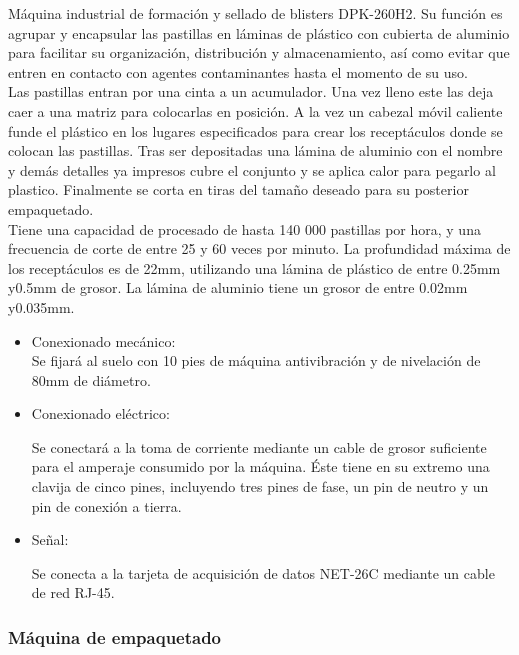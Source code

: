 	Máquina industrial de formación y sellado de blisters DPK-260H2. Su función es agrupar y encapsular las pastillas en láminas de plástico con cubierta de aluminio para facilitar su organización, distribución y almacenamiento, así como evitar que entren en contacto con agentes contaminantes hasta el momento de su uso.\\

	Las pastillas entran por una cinta a un acumulador. Una vez lleno este las deja caer a una matriz para colocarlas en posición. A la vez un cabezal móvil caliente funde el plástico en los lugares especificados para crear los receptáculos donde se colocan las pastillas. Tras ser depositadas una lámina de aluminio con el nombre y demás detalles ya impresos cubre el conjunto y se aplica calor para pegarlo al plastico. Finalmente se corta en tiras del tamaño deseado para su posterior empaquetado.\\


	Tiene una capacidad de procesado de hasta 140 000 pastillas por hora, y una frecuencia de corte de entre 25 y 60 veces por minuto. La profundidad máxima de los receptáculos es de 22mm, utilizando una lámina de plástico de entre 0.25mm y0.5mm de grosor. La lámina de aluminio tiene un grosor de entre 0.02mm y0.035mm.


		\begin{itemize}
				\item{Conexionado mecánico:}\\
				
				Se fijará al suelo con 10 pies de máquina antivibración y de nivelación de 80mm de diámetro.

				\item{Conexionado eléctrico:}

				Se conectará a la toma de corriente mediante un cable de grosor suficiente para el amperaje consumido por la máquina. Éste tiene en su extremo una clavija de cinco pines, incluyendo tres pines de fase, un pin de neutro y un pin de conexión a tierra.  
				
				\item{Señal:}

				Se conecta a la tarjeta de acquisición de datos NET-26C mediante un cable de red RJ-45.
		\end{itemize}
	
	\newpage

	\subsubsection{Máquina de empaquetado}

